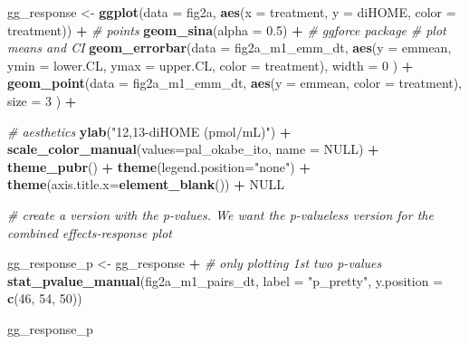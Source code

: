 \documentclass[]{book}
\newenvironment{Shaded}{\begin{snugshade}}{\end{snugshade}}
\newcommand{\CommentTok}[1]{\textcolor[rgb]{0.56,0.35,0.01}{\textit{#1}}}
\newcommand{\DataTypeTok}[1]{\textcolor[rgb]{0.13,0.29,0.53}{#1}}
\newcommand{\DecValTok}[1]{\textcolor[rgb]{0.00,0.00,0.81}{#1}}
\newcommand{\FloatTok}[1]{\textcolor[rgb]{0.00,0.00,0.81}{#1}}
\newcommand{\KeywordTok}[1]{\textcolor[rgb]{0.13,0.29,0.53}{\textbf{#1}}}
\newcommand{\NormalTok}[1]{#1}
\newcommand{\OperatorTok}[1]{\textcolor[rgb]{0.81,0.36,0.00}{\textbf{#1}}}
\newcommand{\OtherTok}[1]{\textcolor[rgb]{0.56,0.35,0.01}{#1}}
\newcommand{\StringTok}[1]{\textcolor[rgb]{0.31,0.60,0.02}{#1}}
\begin{document}
\begin{Shaded}
\begin{Highlighting}[]
\NormalTok{gg_response <-}\StringTok{ }\KeywordTok{ggplot}\NormalTok{(}\DataTypeTok{data =}\NormalTok{ fig2a,}
                            \KeywordTok{aes}\NormalTok{(}\DataTypeTok{x =}\NormalTok{ treatment,}
                                \DataTypeTok{y =}\NormalTok{ diHOME,}
                                \DataTypeTok{color =}\NormalTok{ treatment)) }\OperatorTok{+}
\StringTok{  }\CommentTok{# points}
\StringTok{  }\KeywordTok{geom_sina}\NormalTok{(}\DataTypeTok{alpha =} \FloatTok{0.5}\NormalTok{) }\OperatorTok{+}\StringTok{ }\CommentTok{# ggforce package}
\StringTok{  }
\StringTok{  }\CommentTok{# plot means and CI}
\StringTok{  }\KeywordTok{geom_errorbar}\NormalTok{(}\DataTypeTok{data =}\NormalTok{ fig2a_m1_emm_dt,}
                \KeywordTok{aes}\NormalTok{(}\DataTypeTok{y =}\NormalTok{ emmean,}
                    \DataTypeTok{ymin =}\NormalTok{ lower.CL,}
                    \DataTypeTok{ymax =}\NormalTok{ upper.CL,}
                    \DataTypeTok{color =}\NormalTok{ treatment),}
                \DataTypeTok{width =} \DecValTok{0}
\NormalTok{  ) }\OperatorTok{+}
\StringTok{  }
\StringTok{  }\KeywordTok{geom_point}\NormalTok{(}\DataTypeTok{data =}\NormalTok{ fig2a_m1_emm_dt,}
             \KeywordTok{aes}\NormalTok{(}\DataTypeTok{y =}\NormalTok{ emmean,}
                 \DataTypeTok{color =}\NormalTok{ treatment),}
             \DataTypeTok{size =} \DecValTok{3}
\NormalTok{  ) }\OperatorTok{+}

\StringTok{  }\CommentTok{# aesthetics}
\StringTok{  }\KeywordTok{ylab}\NormalTok{(}\StringTok{"12,13-diHOME (pmol/mL)"}\NormalTok{) }\OperatorTok{+}
\StringTok{  }\KeywordTok{scale_color_manual}\NormalTok{(}\DataTypeTok{values=}\NormalTok{pal_okabe_ito,}
                     \DataTypeTok{name =} \OtherTok{NULL}\NormalTok{) }\OperatorTok{+}
\StringTok{  }\KeywordTok{theme_pubr}\NormalTok{() }\OperatorTok{+}
\StringTok{  }\KeywordTok{theme}\NormalTok{(}\DataTypeTok{legend.position=}\StringTok{"none"}\NormalTok{) }\OperatorTok{+}
\StringTok{  }\KeywordTok{theme}\NormalTok{(}\DataTypeTok{axis.title.x=}\KeywordTok{element_blank}\NormalTok{()) }\OperatorTok{+}
\StringTok{  }
\StringTok{  }\OtherTok{NULL}

\CommentTok{# create a version with the p-values. We want the p-valueless version for the combined effects-response plot}

\NormalTok{gg_response_p <-}\StringTok{ }\NormalTok{gg_response }\OperatorTok{+}\StringTok{ }
\StringTok{      }\CommentTok{# only plotting 1st two p-values}
\StringTok{  }\KeywordTok{stat_pvalue_manual}\NormalTok{(fig2a_m1_pairs_dt,}
                           \DataTypeTok{label =} \StringTok{"p_pretty"}\NormalTok{, }
                           \DataTypeTok{y.position =} \KeywordTok{c}\NormalTok{(}\DecValTok{46}\NormalTok{, }\DecValTok{54}\NormalTok{, }\DecValTok{50}\NormalTok{))}

\NormalTok{gg_response_p}
\end{Highlighting}
\end{Shaded}
\end{document}
